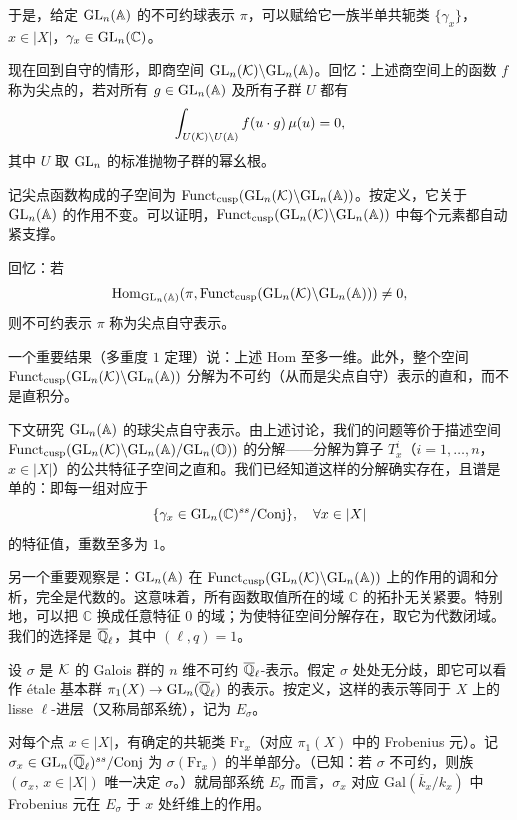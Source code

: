 于是，给定 $\mathrm{GL}_n(\mathbb{A})$ 的不可约球表示 $\pi$，可以赋给它一族半单共轭类 $\{\gamma_x\}$，$x\in|X|$，$\gamma_x\in\mathrm{GL}_n(\mathbb{C})$。

现在回到自守的情形，即商空间 $\mathrm{GL}_n(\mathcal{K})\backslash\allowbreak\mathrm{GL}_n(\mathbb{A})$。回忆：上述商空间上的函数 $f$ 称为尖点的，若对所有 $g\in\mathrm{GL}_n(\mathbb{A})$ 及所有子群 $U$ 都有
\[
\int_{U(\mathcal{K})\backslash\allowbreak U(\mathbb{A})}f(u\cdot g)\,\mu(u)=0,
\]
其中 $U$ 取 $\mathrm{GL}_n$ 的标准抛物子群的幂幺根。

记尖点函数构成的子空间为 $\operatorname{Funct}_{\mathrm{cusp}}(\mathrm{GL}_n(\mathcal{K})\backslash\allowbreak\mathrm{GL}_n(\mathbb{A}))$。按定义，它关于 $\mathrm{GL}_n(\mathbb{A})$ 的作用不变。可以证明，$\operatorname{Funct}_{\mathrm{cusp}}(\mathrm{GL}_n(\mathcal{K})\backslash\allowbreak\mathrm{GL}_n(\mathbb{A}))$ 中每个元素都自动紧支撑。

回忆：若
\[
\operatorname{Hom}_{\mathrm{GL}_n(\mathbb{A})}(\pi,\operatorname{Funct}_{\mathrm{cusp}}(\mathrm{GL}_n(\mathcal{K})\backslash\allowbreak\mathrm{GL}_n(\mathbb{A})))\neq0,
\]
则不可约表示 $\pi$ 称为尖点自守表示。

一个重要结果（多重度 $1$ 定理）说：上述 Hom 至多一维。此外，整个空间 $\operatorname{Funct}_{\mathrm{cusp}}(\mathrm{GL}_n(\mathcal{K})\backslash\allowbreak\mathrm{GL}_n(\mathbb{A}))$ 分解为不可约（从而是尖点自守）表示的直和，而不是直积分。

下文研究 $\mathrm{GL}_n(\mathbb{A})$ 的球尖点自守表示。由上述讨论，我们的问题等价于描述空间 $\operatorname{Funct}_{\mathrm{cusp}}(\mathrm{GL}_n(\mathcal{K})\backslash\allowbreak\mathrm{GL}_n(\mathbb{A})/\mathrm{GL}_n(\mathbb{O}))$ 的分解——分解为算子 $T_x^i$（$i=1,\dots,n$，$x\in|X|$）的公共特征子空间之直和。我们已经知道这样的分解确实存在，且谱是单的：即每一组对应于
\[
\{\gamma_x\in\mathrm{GL}_n(\mathbb{C})^{ss}/\mathrm{Conj}\},\quad\forall x\in|X|
\]
的特征值，重数至多为 $1$。

另一个重要观察是：$\mathrm{GL}_n(\mathbb{A})$ 在 $\operatorname{Funct}_{\mathrm{cusp}}(\mathrm{GL}_n(\mathcal{K})\backslash\allowbreak\mathrm{GL}_n(\mathbb{A}))$ 上的作用的调和分析，完全是代数的。这意味着，所有函数取值所在的域 $\mathbb{C}$ 的拓扑无关紧要。特别地，可以把 $\mathbb{C}$ 换成任意特征 $0$ 的域；为使特征空间分解存在，取它为代数闭域。我们的选择是 $\overline{\mathbb{Q}}_\ell$，其中 $(\ell,q)=1$。

设 $\sigma$ 是 $\mathcal{K}$ 的 Galois 群的 $n$ 维不可约 $\overline{\mathbb{Q}}_\ell$-表示。假定 $\sigma$ 处处无分歧，即它可以看作 \'etale 基本群 $\pi_1(X)\to\mathrm{GL}_n(\overline{\mathbb{Q}}_\ell)$ 的表示。按定义，这样的表示等同于 $X$ 上的 lisse $\ell$-进层（又称局部系统），记为 $E_\sigma$。

对每个点 $x\in|X|$，有确定的共轭类 $\mathrm{Fr}_x$（对应 $\pi_1(X)$ 中的 Frobenius 元）。记 $\sigma_x\in\mathrm{GL}_n(\overline{\mathbb{Q}}_\ell)^{ss}/\mathrm{Conj}$ 为 $\sigma(\mathrm{Fr}_x)$ 的半单部分。（已知：若 $\sigma$ 不可约，则族 $(\sigma_x,\,x\in|X|)$ 唯一决定 $\sigma$。）就局部系统 $E_\sigma$ 而言，$\sigma_x$ 对应 $\mathrm{Gal}(\overline{k}_x/k_x)$ 中 Frobenius 元在 $E_\sigma$ 于 $x$ 处纤维上的作用。

